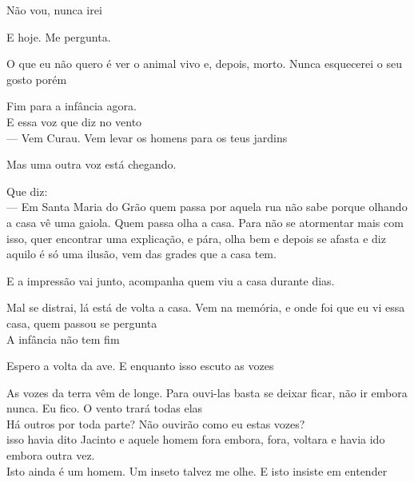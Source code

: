 Não vou, nunca irei

E hoje. Me pergunta.

O que eu não quero é ver o animal vivo e, depois, morto. Nunca
esquecerei o seu gosto porém

\pagebreak

\vspace*{4cm}

Fim para a infância agora.\\

E essa voz que diz no vento\\

--- Vem Curau. Vem levar os homens para os teus jardins\\

\pagebreak

\vspace*{4cm}

Mas uma outra voz está chegando.

Que diz:\\

--- Em Santa Maria do Grão quem passa por aquela rua não sabe porque
olhando a casa vê uma gaiola. Quem passa olha a casa. Para não se
atormentar mais com isso, quer encontrar uma explicação, e pára, olha
bem e depois se afasta e diz aquilo é só uma ilusão, vem das grades que
a casa tem.

E a impressão vai junto, acompanha quem viu a casa durante dias.

Mal se distrai, lá está de volta a casa. Vem na memória, e onde foi que
eu vi essa casa, quem passou se pergunta\\

A infância não tem fim

\pagebreak

\vspace*{4cm}

Espero a volta da ave. E enquanto isso escuto as vozes

As vozes da terra vêm de longe. Para ouvi-las basta se deixar ficar, não
ir embora nunca. Eu fico. O vento trará todas elas\\

Há outros por toda parte? Não ouvirão como eu estas vozes?\\

isso havia dito Jacinto e aquele homem fora embora, fora, voltara e
havia ido embora outra vez.\\

Isto ainda é um homem. Um inseto talvez me olhe. E isto insiste em
entender\\

